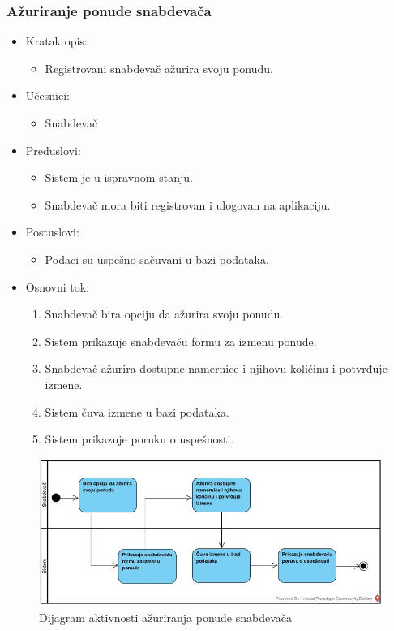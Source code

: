 \subsubsection{Ažuriranje ponude snabdevača}

\begin{itemize}
    \item Kratak opis:
        \begin{itemize}
            \item Registrovani snabdevač ažurira svoju ponudu.
        \end{itemize}
    \item Učesnici:
        \begin{itemize}
            \item Snabdevač
        \end{itemize}
    \item Preduslovi:
        \begin{itemize}
            \item Sistem je u ispravnom stanju.
            \item Snabdevač mora biti registrovan i ulogovan na aplikaciju.
        \end{itemize}
    \item Postuslovi:
        \begin{itemize}
            \item Podaci su uspešno sačuvani u bazi podataka.
        \end{itemize}
    \item Osnovni tok:
        \begin{enumerate}
            \item Snabdevač bira opciju da ažurira svoju ponudu.
            \item Sistem prikazuje snabdevaču formu za izmenu ponude.
            \item Snabdevač ažurira dostupne namernice i njihovu količinu i potvrđuje izmene.
            \item Sistem čuva izmene u bazi podataka.
            \item Sistem prikazuje poruku o uspešnosti. 
        \end{enumerate}
\end{itemize}


\begin{figure}[H]
\begin{center}
\includegraphics[width=\textwidth]{Pictures/activity_update_supplier_account.jpg}
\end{center}
    \caption{Dijagram aktivnosti ažuriranja ponude snabdevača}
\label{fig:ActivityUpdateSupplierAccount}
\end{figure}

